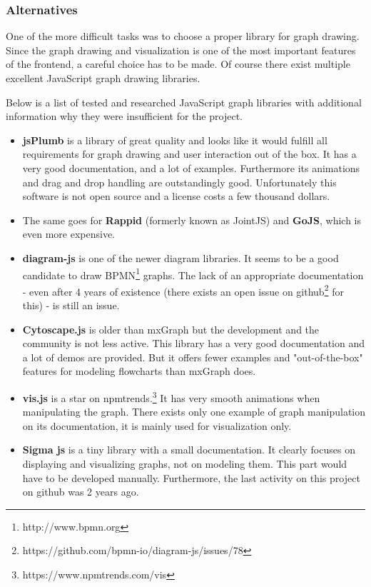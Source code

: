 \documentclass[a4paper,11pt,pdftex,halfparskip,cleardoubleempty,bibtotoc,liststotoc]{scrbook}
\begin{document}
\subsubsection{Alternatives}

One of the more difficult tasks was to choose a proper library for graph drawing. Since the graph drawing and visualization is one of the most important features of the frontend, a careful choice has to be made. Of course there exist multiple excellent JavaScript graph drawing libraries. 

Below is a list of tested and researched JavaScript graph libraries with additional information why they were insufficient for the project.
\begin{itemize}
	\item \textbf{jsPlumb} is a library of great quality and looks like it would fulfill all  requirements for graph drawing and user interaction out of the box. It has a very good documentation, and a lot of examples. Furthermore its animations and drag and drop handling are outstandingly good. Unfortunately this software is not open source and a license costs a few thousand dollars.
	\item The same goes for \textbf{Rappid} (formerly known as JointJS) and \textbf{GoJS}, which is even more expensive.
	\item \textbf{diagram-js} is one of the newer diagram libraries. It seems to be a good candidate to draw BPMN\footnote{http://www.bpmn.org} graphs. The lack of an appropriate documentation - even after 4 years of existence (there exists an open issue on github\footnote{https://github.com/bpmn-io/diagram-js/issues/78} for this) - is still an issue.
	\item \textbf{Cytoscape.js} is older than mxGraph but the development and the community is not less active. This library has a very good documentation and a lot of demos are provided. But it offers fewer examples and "out-of-the-box" features for modeling flowcharts than mxGraph does.
	\item \textbf{vis.js} is a star on npmtrends.\footnote{https://www.npmtrends.com/vis}  It has very smooth animations when manipulating the graph. There exists only one example of graph manipulation on its documentation, it is mainly used for visualization only.
	\item \textbf{Sigma js} is a tiny library with a small documentation. It clearly focuses on displaying and visualizing graphs, not on modeling them. This part would have to be developed manually. Furthermore, the last activity on this project on github was 2 years ago.
\end{itemize}
\end{document}
